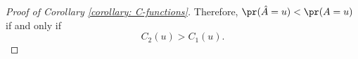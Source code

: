 \begin{appendices}
\begin{proof}[Proof of Corollary \ref{corollary: C-functions}]
Therefore, $\pr (\hat{A} = u) < \pr ({A} = u)$ if and only if
\[
C_2(u) > C_1(u).
\]



\end{proof}





\end{appendices}
